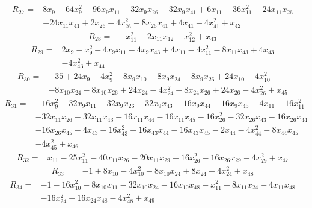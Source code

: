 \[
\begin{aligned}
R_{27}={}&8x_{9}-64x_{9}^{2}-96x_{9}x_{11}-32x_{9}x_{26}-32x_{9}x_{41}+6x_{11}-36x_{11}^{2}-24x_{11}x_{26}\\
&-24x_{11}x_{41}+2x_{26}-4x_{26}^{2}-8x_{26}x_{41}+4x_{41}-4x_{41}^{2}+x_{42}
\end{aligned}
\]
\[
\begin{aligned}
R_{28}={}&-x_{11}^{2}-2x_{11}x_{12}-x_{12}^{2}+x_{43}
\end{aligned}
\]
\[
\begin{aligned}
R_{29}={}&2x_{9}-x_{9}^{2}-4x_{9}x_{11}-4x_{9}x_{43}+4x_{11}-4x_{11}^{2}-8x_{11}x_{43}+4x_{43}\\
&-4x_{43}^{2}+x_{44}
\end{aligned}
\]
\[
\begin{aligned}
R_{30}={}&-35+24x_{9}-4x_{9}^{2}-8x_{9}x_{10}-8x_{9}x_{24}-8x_{9}x_{26}+24x_{10}-4x_{10}^{2}\\
&-8x_{10}x_{24}-8x_{10}x_{26}+24x_{24}-4x_{24}^{2}-8x_{24}x_{26}+24x_{26}-4x_{26}^{2}+x_{45}
\end{aligned}
\]
\[
\begin{aligned}
R_{31}={}&-16x_{9}^{2}-32x_{9}x_{11}-32x_{9}x_{26}-32x_{9}x_{43}-16x_{9}x_{44}-16x_{9}x_{45}-4x_{11}-16x_{11}^{2}\\
&-32x_{11}x_{26}-32x_{11}x_{43}-16x_{11}x_{44}-16x_{11}x_{45}-16x_{26}^{2}-32x_{26}x_{43}-16x_{26}x_{44}\\
&-16x_{26}x_{45}-4x_{43}-16x_{43}^{2}-16x_{43}x_{44}-16x_{43}x_{45}-2x_{44}-4x_{44}^{2}-8x_{44}x_{45}\\
&-4x_{45}^{2}+x_{46}
\end{aligned}
\]
\[
\begin{aligned}
R_{32}={}&x_{11}-25x_{11}^{2}-40x_{11}x_{26}-20x_{11}x_{29}-16x_{26}^{2}-16x_{26}x_{29}-4x_{29}^{2}+x_{47}
\end{aligned}
\]
\[
\begin{aligned}
R_{33}={}&-1+8x_{10}-4x_{10}^{2}-8x_{10}x_{24}+8x_{24}-4x_{24}^{2}+x_{48}
\end{aligned}
\]
\[
\begin{aligned}
R_{34}={}&-1-16x_{10}^{2}-8x_{10}x_{11}-32x_{10}x_{24}-16x_{10}x_{48}-x_{11}^{2}-8x_{11}x_{24}-4x_{11}x_{48}\\
&-16x_{24}^{2}-16x_{24}x_{48}-4x_{48}^{2}+x_{49}
\end{aligned}
\]
